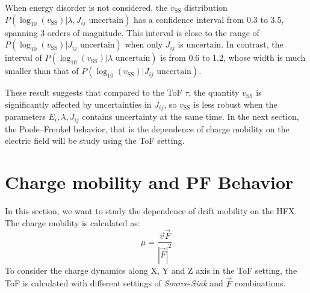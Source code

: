 \documentclass[%
 reprint,
superscriptaddress,
 amsmath,amssymb,
 aps,
prb,
floatfix
]{revtex4-2}
\begin{document}
When energy disorder is not considered, the $v_\text{SS}$ distribution $P(\log_{10}(v_\text{SS})|\lambda, J_{ij} \text{ uncertain})$ has a confidence interval from 0.3 to 3.5, spanning 3 orders of magnitude. This interval is close to the range of $P(\log_{10}(v_\text{SS})|J_{ij} \text{ uncertain})$ when only $J_{ij}$ is uncertain. 
In contrast, the interval of $P(\log_{10}(v_\text{SS})|\lambda \text{ uncertain})$ is from 0.6 to 1.2, whose width is much smaller than that of $P(\log_{10}(v_\text{SS})|J_{ij} \text{ uncertain})$.

These result suggests that compared to the ToF $\tau$, the quantity $v_\text{SS}$ is significantly affected by uncertainties in $J_{ij}$, so $v_\text{SS}$ is less robust when the parameters $E_i, \lambda, J_{ij}$ contains uncertainty at the same time. 
In the next section, the Poole–Frenkel behavior, that is the dependence of charge mobility on the electric field will be study using the ToF setting. 

\section{Charge mobility and PF Behavior}

In this section, we want to study the dependence of drift mobility on the HFX. The charge mobility is calculated as:
\begin{equation}
    \mu = \frac{\vec{v} \vec{F} }{ |\vec{F}|^2}
    \label{eq:mu}
\end{equation}
To consider the charge dynamics along X, Y and Z axis in the ToF setting, the ToF is calculated with different settings of \textit{Source}-\textit{Sink} and $\vec{F}$ combinations.
\end{document}
